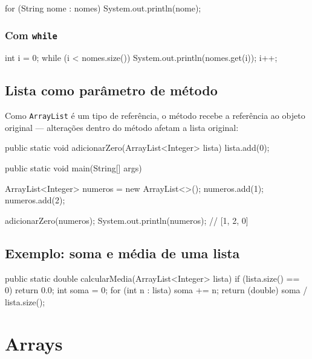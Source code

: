 \documentclass[12pt, a4paper]{article}
\newcommand{\code}[1]{\texttt{\color{javaDeep}#1}}
\begin{document}
\begin{javacode}
for (String nome : nomes) {
    System.out.println(nome);
}
\end{javacode}

\subsubsection{Com \texttt{while}}

\begin{javacode}
int i = 0;
while (i < nomes.size()) {
    System.out.println(nomes.get(i));
    i++;
}
\end{javacode}

\subsection{Lista como parâmetro de método}

Como \code{ArrayList} é um tipo de referência, o método recebe a referência ao objeto original --- alterações dentro do método afetam a lista original:

\begin{javacode}
public static void adicionarZero(ArrayList<Integer> lista) {
    lista.add(0);
}

public static void main(String[] args) {
    ArrayList<Integer> numeros = new ArrayList<>();
    numeros.add(1);
    numeros.add(2);

    adicionarZero(numeros);
    System.out.println(numeros); // [1, 2, 0]
}
\end{javacode}

\subsection{Exemplo: soma e média de uma lista}

\begin{javacode}
public static double calcularMedia(ArrayList<Integer> lista) {
    if (lista.size() == 0) {
        return 0.0;
    }
    int soma = 0;
    for (int n : lista) {
        soma += n;
    }
    return (double) soma / lista.size();
}
\end{javacode}

\section{Arrays}
\end{document}
